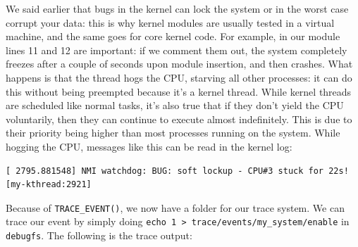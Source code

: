We said earlier that bugs in the kernel can lock the system or in the worst case corrupt your data: this is why kernel modules are usually tested in a virtual machine, and the same goes for core kernel code. For example, in our module lines 11 and 12 are important: if we comment them out, the system completely freezes after a couple of seconds upon module insertion, and then crashes. What happens is that the thread hogs the CPU, starving all other processes: it can do this without being preempted because it's a kernel thread. While kernel threads are scheduled like normal tasks, it's also true that if they don't yield the CPU voluntarily, then they can continue to execute almost indefinitely. This is due to their priority being higher than most processes running on the system.
While hogging the CPU, messages like this can be read in the kernel log:
\begin{Verbatim}
[ 2795.881548] NMI watchdog: BUG: soft lockup - CPU#3 stuck for 22s! [my-kthread:2921]    
\end{Verbatim}
Because of \verb|TRACE_EVENT()|, we now have a folder for our trace system. We can trace our event by simply doing \verb|echo 1 > trace/events/my_system/enable| in \verb|debugfs|. The following is the trace output:
